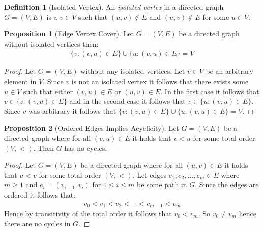 \documentclass[a4paper,12pt]{article}
\theoremstyle{definition}
\newtheorem{definition}{Definition}[section]
\newtheorem{proposition}{Proposition}[section]
\begin{document}
\begin{definition}[Isolated Vertex]
    An \emph{isolated vertex} in a directed graph $G = (V, E)$ is a $v \in V$
    such that $(u, v) \notin E$ and $(u, v) \notin E$ for some $u \in V$.
\end{definition}
\begin{proposition}[Edge Vertex Cover]
    Let $G = (V, E)$ be a directed graph without isolated vertices then:
    \begin{align*}
        \{v : (v, u) \in E\} \cup \{u : (v, u) \in E\} = V
    \end{align*}
\end{proposition}
\begin{proof}
    Let $G = (V, E)$ without any isolated vertices. Let $v \in V$ be an
    arbitrary element in $V$. Since $v$ is not an isolated vertex it follows
    that there exists some $u \in V$ such that either $(v, u) \in E$ or $(u, v)
    \in E$. In the first case it follows that $v \in \{v : (v, u) \in E\}$ and
    in the second case it follows that $v \in \{u : (v, u) \in E\}$. Since $v$
    was arbitrary it follows that $\{v : (v, u) \in E\} \cup \{u : (v, u) \in
    E\} = V$.
\end{proof}

\begin{proposition}[Ordered Edges Implies Acyclicity]\label{prop:ordered-edges-implies-acyclicity}
    Let $G = (V, E)$ be a directed graph where for all $(v, u) \in E$ it holds
    that $v < u$ for some total order $(V, <)$. Then $G$ has no cycles.
\end{proposition}

\begin{proof}
    Let $G = (V, E)$ be a directed graph where for all $(u, v) \in E$ it holds
    that $u < v$ for some total order $(V, <)$. Let edges $e_1, e_2, \ldots, e_m
    \in E$ where $m \geq 1$ and $e_i = (v_{i-1}, v_i)$ for $1 \leq i \leq m$ be
    some path in $G$. Since the edges are ordered it follows that:
    \begin{align*}
        v_0 < v_1 < v_2 < \cdots < v_{m - 1} < v_m
    \end{align*}
    Hence by transitivity of the total order it follows that $v_0 < v_m$. So
    $v_0 \neq v_m$ hence there are no cycles in $G$.
\end{proof}
\end{document}
